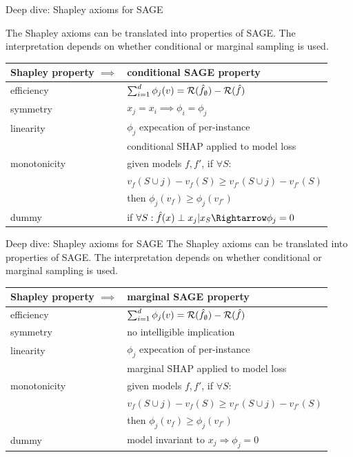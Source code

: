 \documentclass[11pt,compress,t,notes=noshow, aspectratio=169, xcolor=table]{beamer}
\begin{document}

\begin{frame}{Deep dive: Shapley axioms for SAGE}

The Shapley axioms can be translated into properties of SAGE. The interpretation depends on whether conditional or marginal sampling is used.
%
\begin{table}
  \centering
  \begin{tabular}{l | l }
  Shapley property $\implies$ & conditional SAGE property \\
  \hline
  efficiency & $\sum_{i=1}^d \phi_j(v) = \risk(\fh_\emptyset) - \risk(\fh)$\\
  symmetry & $x_j = x_i \implies \phi_i = \phi_j$ \\
  linearity & $\phi_j$ expecation of per-instance\\
  & conditional SHAP applied to model loss\\
  monotonicity & given models $f, f'$, if  $\forall S:$\\
  &$v_f(S \cup j) - v_f(S) \geq v_{f'}(S \cup j) - v_{f'}(S)$ \\
  &then $\phi_j(v_f) \geq \phi_j(v_{f'})$\\
  dummy & if $\forall S: \fh(x) \indep x_j | x_S \Rightarrow \phi_j = 0$
  \end{tabular}
\end{table}

\end{frame}

\begin{frame}{Deep dive: Shapley axioms for SAGE}
%
The Shapley axioms can be translated into properties of SAGE. The interpretation depends on whether conditional or marginal sampling is used.
%
\begin{table}
  \centering
  \begin{tabular}{l | l }
  Shapley property $\implies$ & marginal SAGE property \\
  \hline
  efficiency & $\sum_{i=1}^d \phi_j(v) = \risk(\fh_\emptyset) - \risk(\fh)$\\
  symmetry & no intelligible implication \\
  linearity & $\phi_j$ expecation of per-instance\\
  & marginal SHAP applied to model loss\\
  monotonicity & given models $f, f'$, if  $\forall S:$\\
  &$v_f(S \cup j) - v_f(S) \geq v_{f'}(S \cup j) - v_{f'}(S)$ \\
  &then $\phi_j(v_f) \geq \phi_j(v_{f'})$\\
  dummy & model invariant to $x_j \Rightarrow \phi_j = 0$\\
  \end{tabular}
\end{table}
%
\end{frame}

\endlecture
\end{document}
